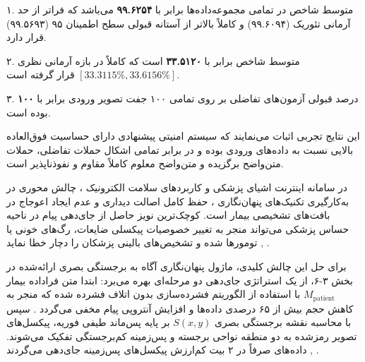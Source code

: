 ۱. متوسط شاخص  در تمامی مجموعه‌داده‌ها برابر با \textbf{۹۹.۶۲۵۴} می‌باشد که فراتر از حد آرمانی تئوریک (۹۹.۶۰۹۴) و کاملاً بالاتر از آستانه قبولی سطح اطمینان ۹۵ (۹۹.۵۶۹۳) قرار دارد.\par

۲. متوسط شاخص  برابر با \textbf{۳۳.۵۱۲۰} است که کاملاً در بازه آرمانی نظری $[33.3115\%,\allowbreak{} 33.6156\%]$ قرار گرفته است.\par

۳. درصد قبولی آزمون‌های تفاضلی بر روی تمامی ۱۰۰ جفت تصویر ورودی برابر با \textbf{۱۰۰} بوده است.\par



این نتایج تجربی اثبات می‌نمایند که سیستم امنیتی پیشنهادی دارای حساسیت فوق‌العاده بالایی نسبت به داده‌های ورودی بوده و در برابر تمامی اشکال حملات تفاضلی، حملات متن‌واضح برگزیده  و متن‌واضح معلوم  کاملاً مقاوم و نفوذناپذیر است.\par



در سامانه اینترنت اشیای پزشکی  و کاربردهای سلامت الکترونیک ، چالش محوری در به‌کارگیری تکنیک‌های پنهان‌نگاری ، حفظ کامل اصالت دیداری و عدم ایجاد اعوجاج در بافت‌های تشخیصی بیمار است. کوچک‌ترین نویز حاصل از جای‌دهی پیام در ناحیه حساس پزشکی  می‌تواند منجر به تغییر خصوصیات پیکسلی ضایعات، رگ‌های خونی یا تومورها شده و تشخیص‌های بالینی پزشکان را دچار خطا نماید , .\par



برای حل این چالش کلیدی، ماژول پنهان‌نگاری آگاه به برجستگی بصری  ارائه‌شده در بخش ۳{-}۶، از یک استراتژی جای‌دهی دو مرحله‌ای بهره می‌برد: ابتدا متن فراداده بیمار $M_{\mathrm{patient}}$ با استفاده از الگوریتم فشرده‌سازی بدون اتلاف  فشرده شده که منجر به کاهش حجم بیش از ۶۵ درصدی داده‌ها و افزایش آنتروپی پیام مخفی می‌گردد . سپس با محاسبه نقشه برجستگی بصری $S(x,\allowbreak{}y)$ بر پایه پس‌ماند طیفی فوریه، پیکسل‌های تصویر رمزشده به دو منطقه نواحی برجسته  و پس‌زمینه کم‌برجستگی  تفکیک می‌شوند. داده‌های  صرفاً در ۲ بیت کم‌ارزش  پیکسل‌های پس‌زمینه جای‌دهی می‌گردند , .\par

